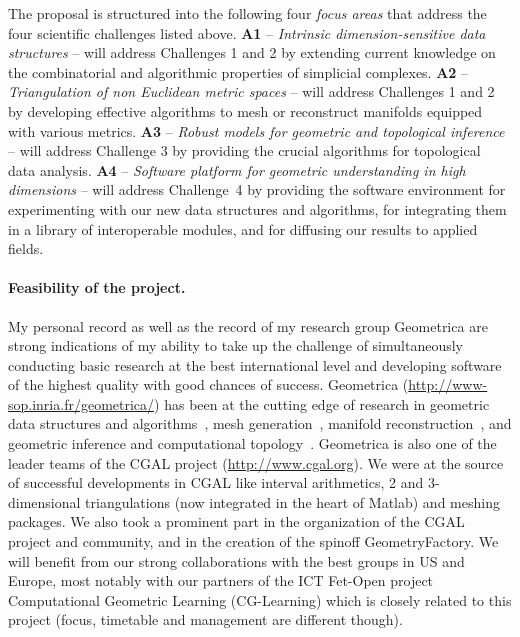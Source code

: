 The proposal is structured into the following four {\em focus areas}  that address the four scientific challenges listed above.
{\bf A1} -- {\em Intrinsic dimension-sensitive data  structures} --  will address Challenges 1 and 2 by extending current knowledge on the combinatorial and algorithmic properties of simplicial complexes. 
  {\bf A2} --  {\em Triangulation of non Euclidean metric spaces} -- will address Challenges 1 and 2 by developing effective algorithms to mesh or reconstruct manifolds equipped with various metrics.   {\bf A3} -- {\em Robust models for geometric and topological inference} -- will address Challenge 3 by providing the crucial  algorithms for topological data analysis.
 {\bf A4} --  {\em  Software platform for geometric understanding in high dimensions} -- will address Challenge~4 by providing the software environment for experimenting with our new data structures and algorithms, for integrating them in a library of interoperable modules, and for diffusing our results to applied fields. 
\vspace{-3mm}

\paragraph{Feasibility of the project.} 


My personal record as well as the record of my research group Geometrica are strong indications of my ability to take up the challenge of simultaneously conducting basic research at the best international level and developing software of the highest quality with good chances of success.  
Geometrica (\url{http://www-sop.inria.fr/geometrica/}) has been at the cutting edge of research in geometric data
structures and algorithms~\cite{by-ag-98}, mesh
generation~\cite{geometrica-ecg-book}, manifold
reconstruction~\cite{geometrica-7142i,geometrica-bgo-09}, and geometric inference and computational topology~\cite{ccsm-gipm-2011,geometrica-cseh-07}. Geometrica is also one of the leader teams of the CGAL project (\url{http://www.cgal.org}{}).  We were at the source of successful developments in CGAL like interval arithmetics, 2 and 3-dimensional triangulations (now integrated in the heart of Matlab) and meshing packages. We also took a prominent part in the organization of the CGAL project and community, and in the creation of the spinoff GeometryFactory.
%
We will benefit from our strong collaborations with the best groups in US and  Europe,
most notably with our partners of the ICT Fet-Open project Computational Geometric Learning (CG-Learning) which is closely related to this project (focus, timetable and management are different though).

